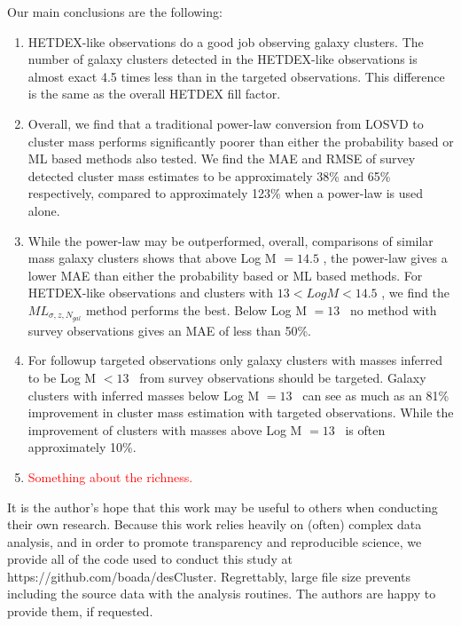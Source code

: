 \documentclass[fleqn,usenatbib]{mnras}
\newcommand{\editorial}[1]{\textcolor{red}{#1}}
\begin{document}
Our main conclusions are the following:
\begin{enumerate}
	\item HETDEX-like observations do a good job observing galaxy clusters. The number of galaxy clusters detected in the HETDEX-like observations is almost exact 4.5 times less than in the targeted observations. This difference is the same as the overall HETDEX fill factor.
	\item Overall, we find that a traditional power-law conversion from LOSVD to cluster mass performs significantly poorer than either the probability based or ML based methods also tested. We find the MAE and RMSE of survey detected cluster mass estimates to be approximately 38\% and 65\% respectively, compared to approximately 123\% when a power-law is used alone.
	\item While the power-law may be outperformed, overall, comparisons of similar mass galaxy clusters shows that above Log M $=14.5$ \Msol, the power-law gives a lower MAE than either the probability based or ML based methods. For HETDEX-like observations and clusters with $13 < Log M <14.5$ \Msol, we find the $ML_{\sigma, z, N_{gal}}$ method performs the best. Below Log M $=13$ \Msol\ no method with survey observations gives an MAE of less than 50\%.
	\item For followup targeted observations only galaxy clusters with masses inferred to be Log M $<13$ \Msol\ from survey observations should be targeted. Galaxy clusters with inferred masses below Log M $=13$ \Msol\ can see as much as an 81\% improvement in cluster mass estimation with targeted observations. While the improvement of clusters with masses above Log M $=13$ \Msol\ is often approximately 10\%.
	\item \editorial{Something about the richness.}
\end{enumerate}

It is the author's hope that this work may be useful to others when conducting their own research. Because this work relies heavily on (often) complex data analysis, and in order to promote transparency and reproducible science, we provide all of the code used to conduct this study at https://github.com/boada/desCluster. Regrettably, large file size prevents including the source data with the analysis routines. The authors are happy to provide them, if requested.
\end{document}
